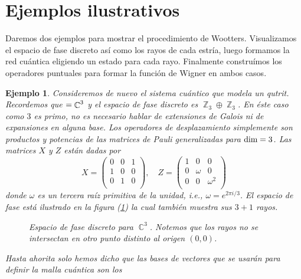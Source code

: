 \documentclass[a4paper]{report}
\DeclareMathOperator{\C}{\mathbb{C}}
\DeclareMathOperator{\Z}{\mathbb{Z}}
\let\H\relax
\DeclareMathOperator{\H}{\mathcal H}
\newtheorem{example}{Ejemplo}
\begin{document}
  \section{Ejemplos ilustrativos}

  Daremos dos ejemplos para mostrar el procedimiento de
  Wootters. Visualizamos el espacio de fase discreto así
  como los rayos de cada estría, luego formamos la red
  cuántica eligiendo un estado para cada rayo.  Finalmente
  construímos los operadores puntuales para formar la
  función de Wigner en ambos casos.

  \begin{example}
    Consideremos de nuevo el sistema cuántico que modela un
    qutrit. Recordemos que $\H = \C^{3}$ y el espacio de
    fase discreto es $\Z_3 \oplus \Z_3$. En éste caso como
    $3$ es primo, no es necesario hablar de extensiones de
    Galois ni de expansiones en alguna base. Los operadores
    de desplazamiento simplemente son productos y potencias
    de las matrices de Pauli generalizadas para $\dim \H =
    3$. Las matrices $X$ y $Z$ están dadas por
    \begin{equation}
      X = \begin{pmatrix} 
        0 & 0 & 1 \\
        1 & 0 & 0 \\
        0 & 1 & 0 \\
      \end{pmatrix},
      \quad
      Z = \begin{pmatrix} 
        1 & 0 & 0 \\
        0 & \omega & 0 \\
        0 & 0 & \omega^2 \\
      \end{pmatrix} 
    \end{equation}
    donde $\omega$ es un tercera raíz primitiva de la
    unidad, i.e., $\omega = e^{2\pi i / 3}$. El espacio de
    fase está ilustrado en la figura
    (\ref{fig:qutrit-phase-space}) la cual también muestra
    sus $3 + 1$ rayos. 
    \begin{figure}[ht]
      \centering
      \scalebox{0.6}{
        
      }
      \caption{Espacio de fase discreto para $\C^3$. Notemos
      que los rayos no se intersectan en otro punto distinto
      al origen $(0,0)$.}
      \label{fig:qutrit-phase-space}
    \end{figure}
    Hasta ahorita solo hemos dicho que las bases de vectores
    que se usarán para definir la malla cuántica son los

\end{example}
\end{document}

